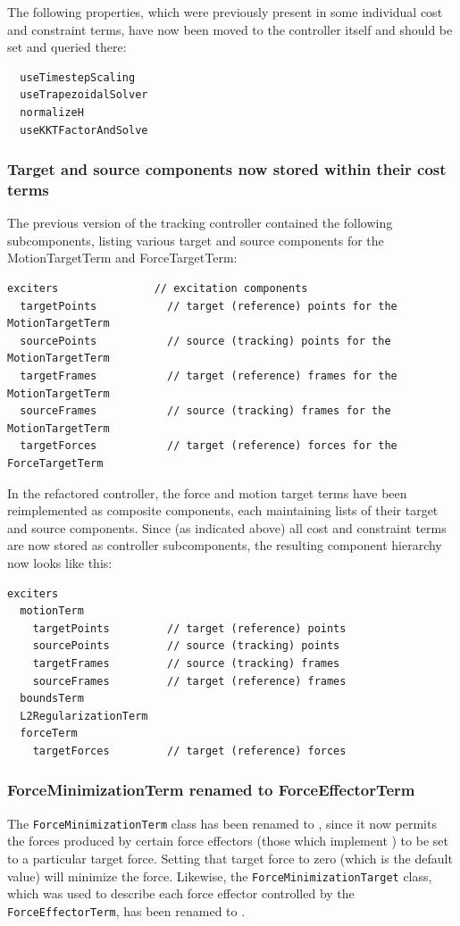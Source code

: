 \documentclass{article}
\begin{document}
The following properties, which were previously present in some
individual cost and constraint terms, have now been moved to the
controller itself and should be set and queried there:
%
\begin{verbatim}
  useTimestepScaling
  useTrapezoidalSolver
  normalizeH 
  useKKTFactorAndSolve
\end{verbatim}
%

\subsubsection*{Target and source components now stored 
within their cost terms}

The previous version of the tracking controller contained the
following subcomponents, listing various target and source components
for the MotionTargetTerm and ForceTargetTerm:
%
\begin{lstlisting}[]
  exciters               // excitation components
  targetPoints           // target (reference) points for the MotionTargetTerm
  sourcePoints           // source (tracking) points for the MotionTargetTerm
  targetFrames           // target (reference) frames for the MotionTargetTerm
  sourceFrames           // source (tracking) frames for the MotionTargetTerm
  targetForces           // target (reference) forces for the ForceTargetTerm
\end{lstlisting}
%
In the refactored controller, the force and motion target terms have
been reimplemented as composite components, each maintaining lists of
their target and source components. Since (as indicated above) all
cost and constraint terms are now stored as controller subcomponents,
the resulting component hierarchy now looks like this:
%
\begin{lstlisting}[]
  exciters
  motionTerm
    targetPoints         // target (reference) points
    sourcePoints         // source (tracking) points 
    targetFrames         // source (tracking) frames 
    sourceFrames         // target (reference) frames
  boundsTerm
  L2RegularizationTerm
  forceTerm
    targetForces         // target (reference) forces
\end{lstlisting}
%

\subsubsection*{ForceMinimizationTerm renamed to ForceEffectorTerm}

The {\tt ForceMinimizationTerm} class has been renamed to
, since it now
permits the forces produced by certain force effectors (those which
implement ) to
be set to a particular target force. Setting that target force to zero
(which is the default value) will minimize the force. Likewise, the
{\tt ForceMinimizationTarget} class, which was used to describe each
force effector controlled by the {\tt ForceEffectorTerm}, has been
renamed to .
\end{document}
